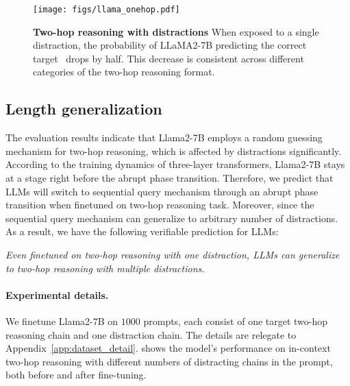 \begin{figure}[h]
    \centering
    \texttt{[image: figs/llama\_onehop.pdf]}
    \caption{\textbf{Two-hop reasoning with distractions} When exposed to a single distraction, the probability of LLaMA2-7B predicting the correct target \Ed~drops by half. This decrease is consistent across different categories of the two-hop reasoning format.}
    \label{fig:llm-onehop}
\end{figure}

\subsection{Length generalization}
\label{subsec:length_gen}
The evaluation results indicate that Llama2-7B employs a random guessing mechanism for two-hop reasoning, which is affected by distractions significantly.
According to the training dynamics of three-layer transformers, Llama2-7B stays at a stage right before the abrupt phase transition. Therefore, we predict that LLMs will switch to sequential query mechanism through an abrupt phase transition when finetuned on two-hop reasoning task. Moreover, since the sequential query mechanism can generalize to arbitrary number of distractions. As a result, we have the following verifiable prediction for LLMs:
\begin{center}
\textit{Even finetuned on two-hop reasoning with one distraction, LLMs can generalize to two-hop reasoning with multiple distractions.}
\end{center}

\paragraph{Experimental details.} We finetune Llama2-7B on $1000$ prompts, each consist of one target two-hop reasoning chain and one distraction chain. The details are relegate to Appendix~\ref{app:dataset_detail}.
 shows the model's performance on in-context two-hop reasoning with different numbers of distracting chains in the prompt, both before and after fine-tuning. 

